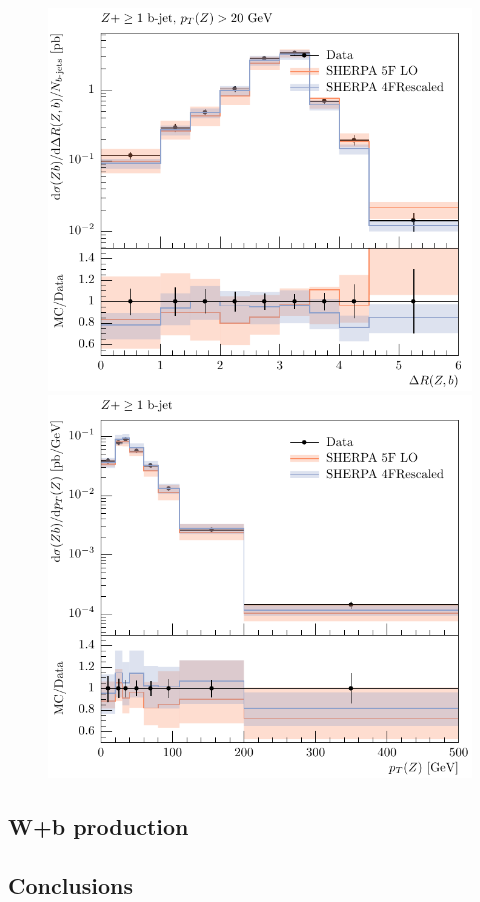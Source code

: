 \documentclass[11pt]{cernrep} \usepackage{graphicx,epsfig} 
\begin{document}
\begin{figure}[htbp]
   \includegraphics[scale=0.5]{figs/zbb/d13-x01-y01_rescaled.pdf}
   \includegraphics[scale=0.5]{figs/zbb/d15-x01-y01_rescaled.pdf}
\end{figure}

\subsection{W+b production}

\subsection{Conclusions}


\end{document}
